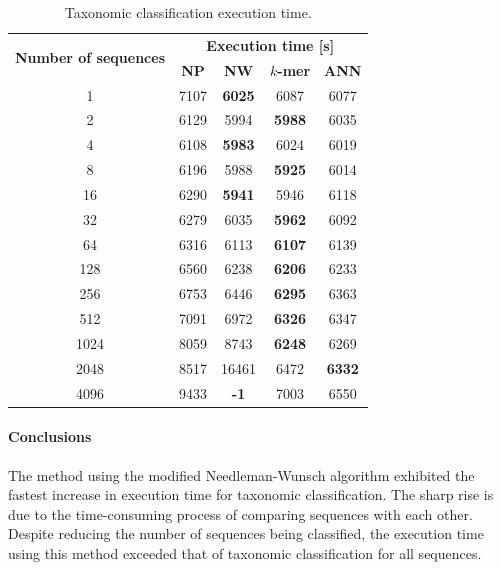 \documentclass[pdflatex,sn-vancouver-num]{sn-jnl}%
\begin{document}
                \begin{table}\centering
                    \caption{Taxonomic classification execution time.}\label{Table:Experiment:Duration}
                    \begin{tabular}{|c||c|c|c|c|}
                        \hline
                        \multirow{2}{*}{\textbf{Number of sequences}} & \multicolumn{4}{|c|}{\textbf{Execution time [s]}} \\
                                        & \textbf{NP} & \textbf{NW} & \textbf{$k$-mer} & \textbf{ANN} \\ \hline \hline
                                        1 & 7107 & \textbf{6025} & 6087 & 6077\\ \hline
                                        2 & 6129 & 5994 & \textbf{5988} & 6035\\ \hline
                                        4 & 6108 & \textbf{5983} & 6024 & 6019\\ \hline
                                        8 & 6196 & 5988 & \textbf{5925} & 6014\\ \hline
                                        16 & 6290 & \textbf{5941} & 5946 & 6118\\ \hline
                                        32 & 6279 & 6035 & \textbf{5962} & 6092\\ \hline
                                        64 & 6316 & 6113 & \textbf{6107} & 6139\\ \hline
                                        128 & 6560 & 6238 & \textbf{6206} & 6233\\ \hline
                                        256 & 6753 & 6446 & \textbf{6295} & 6363\\ \hline
                                        512 & 7091 & 6972 & \textbf{6326} & 6347\\ \hline
                                        1024 & 8059 & 8743 & \textbf{6248} & 6269\\ \hline
                                        2048 & 8517 & 16461 & 6472 & \textbf{6332}\\ \hline
                                        4096 & 9433 & \textbf{-1} & 7003 & 6550\\ \hline

                    \end{tabular}
                \end{table}

                \paragraph{Conclusions}
                The method using the modified Needleman-Wunsch algorithm exhibited the fastest increase in execution time for taxonomic classification. The sharp rise is due to the time-consuming process of comparing sequences with each other. Despite reducing the number of sequences being classified, the execution time using this method exceeded that of taxonomic classification for all sequences.
\end{document}
